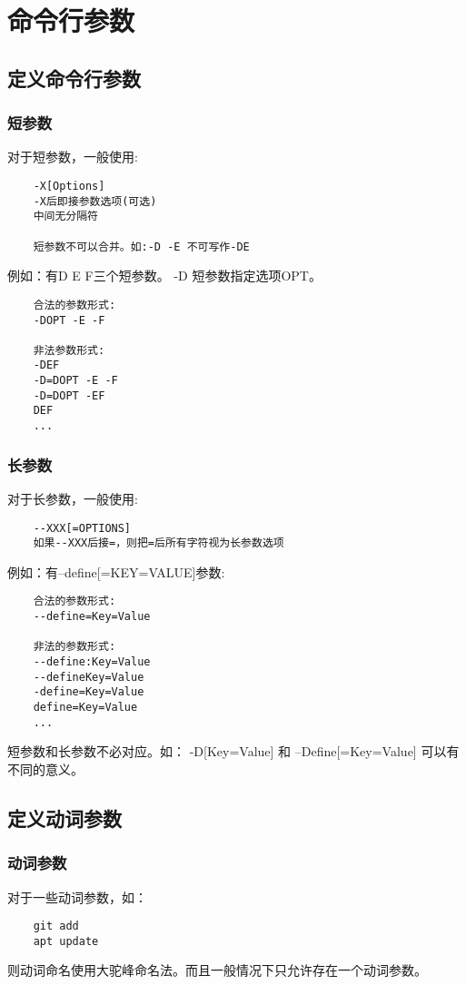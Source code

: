 \chapter{命令行参数}
\section{定义命令行参数}





\subsection{短参数}

对于短参数，一般使用:
\begin{lstlisting}
	-X[Options]
	-X后即接参数选项(可选)
	中间无分隔符
	
	短参数不可以合并。如:-D -E 不可写作-DE
\end{lstlisting}

例如：有D E F三个短参数。
-D 短参数指定选项OPT。
\begin{lstlisting}
	合法的参数形式:
	-DOPT -E -F
	
	非法参数形式:
	-DEF
	-D=DOPT -E -F
	-D=DOPT -EF
	DEF
	...
\end{lstlisting}





\subsection{长参数}

对于长参数，一般使用:
\begin{lstlisting}
	--XXX[=OPTIONS]
	如果--XXX后接=，则把=后所有字符视为长参数选项	
\end{lstlisting}

例如：有--define[=KEY=VALUE]参数:
\begin{lstlisting}
	合法的参数形式:
	--define=Key=Value
	
	非法的参数形式:
	--define:Key=Value
	--defineKey=Value
	-define=Key=Value
	define=Key=Value
	...
\end{lstlisting}
短参数和长参数不必对应。如：
-D[Key=Value]
和
--Define[=Key=Value]
可以有不同的意义。


\section{定义动词参数}
\subsection{动词参数}
对于一些动词参数，如：
\begin{lstlisting}
	git add
	apt update
\end{lstlisting}
则动词命名使用大驼峰命名法。而且一般情况下只允许存在一个动词参数。


